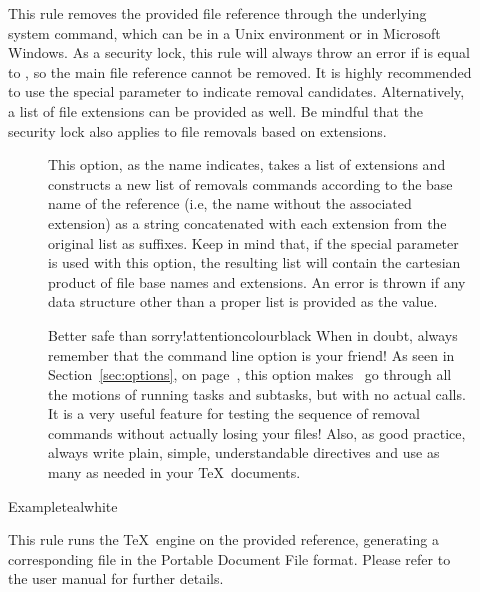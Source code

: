 \begin{description}
\item[]
This rule removes the provided file reference through the underlying system command, which can be  in a Unix environment or  in Microsoft Windows. As a security lock, this rule will always throw an error if  is equal to , so the main file reference cannot be removed. It is highly recommended to use the special  parameter to indicate removal candidates. Alternatively, a list of file extensions can be provided as well. Be mindful that the security lock also applies to file removals based on extensions.

\begin{description}
\item[] This option, as the name indicates, takes a list of extensions and constructs a new list of removals commands according to the base name of the  reference (i.e, the name without the associated extension) as a string concatenated with each extension from the original list as suffixes. Keep in mind that, if the special  parameter is used with this option, the resulting list will contain the cartesian product of file base names and extensions. An error is thrown if any data structure other than a proper list is provided as the value.

\begin{messagebox}{Better safe than sorry!}{attentioncolour}{\icattention}{black}
When in doubt, always remember that the  command line option is your friend! As seen in Section~\ref{sec:options}, on page~\pageref{sec:options}, this option makes \arara\ go through all the motions of running tasks and subtasks, but with no actual calls. It is a very useful feature for testing the sequence of removal commands without actually losing your files! Also, as good practice, always write plain, simple, understandable  directives and use as many as needed in your \TeX\ documents.
\end{messagebox}
\end{description}

\begin{codebox}{Example}{teal}{\icnote}{white}
\end{codebox}

\item[]
This rule runs the  \TeX\ engine on the provided  reference, generating a corresponding file in the Portable Document File format. Please refer to the user manual for further details.


\end{description}
